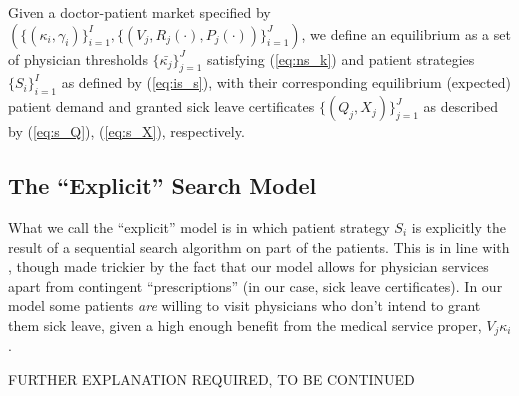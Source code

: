 \documentclass[../main.tex]{subfiles}
\begin{document}
\begin{equilibrium}
    \label{is_eq}
Given a doctor-patient market specified by \\ $(\{(\kappa_i,\gamma_i)\}_{i =1}^{I},\{(V_j,R_j(\cdot),P_j(\cdot))\}_{i =1}^{J})$, we define an equilibrium as a set of physician thresholds $\{\bar{\kappa_j}\}_{j =1}^{J}$ satisfying (\ref{eq:ns_k}) and patient strategies $\{S_i\}_{i =1}^{I}$ as defined by (\ref{eq:is_s}), with their corresponding equilibrium (expected) patient demand and granted sick leave certificates $\{(Q_j,X_j)\}_{j =1}^{J}$ as described by (\ref{eq:s_Q}), (\ref{eq:s_X}), respectively.
\end{equilibrium}

\subsection{The ``Explicit'' Search Model}

What we call the ``explicit'' model is in which patient strategy $S_i$ is explicitly the result of a sequential search algorithm on part of the patients. This is in line with \cite{schnell2017physician}, though made trickier by the fact that our model allows for physician services apart from contingent ``prescriptions'' (in our case, sick leave certificates). In our model some patients \textit{are} willing to visit physicians who don't intend to grant them sick leave, given a high enough benefit from the medical service proper, $V_j \kappa_i$.

FURTHER EXPLANATION REQUIRED, TO BE CONTINUED
\end{document}
